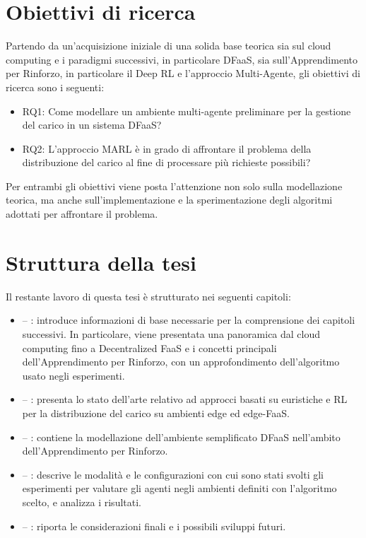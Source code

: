 \section{Obiettivi di ricerca}
\label{sec:1_obiettivi_ricerca}

Partendo da un'acquisizione iniziale di una solida base teorica sia sul cloud computing e i paradigmi successivi, in particolare DFaaS, sia sull'Apprendimento per Rinforzo, in particolare il Deep RL e l'approccio Multi-Agente, gli obiettivi di ricerca sono i seguenti:

\begin{itemize}
    \item RQ1: Come modellare un ambiente multi-agente preliminare per la gestione del carico in un sistema DFaaS?

    \item RQ2: L'approccio MARL è in grado di affrontare il problema della distribuzione del carico al fine di processare più richieste possibili?
\end{itemize}

Per entrambi gli obiettivi viene posta l'attenzione non solo sulla modellazione teorica, ma anche sull'implementazione e la sperimentazione degli algoritmi adottati per affrontare il problema.

\section{Struttura della tesi}

Il restante lavoro di questa tesi è strutturato nei seguenti capitoli:

\begin{itemize}
    \item {} -- : introduce informazioni di base necessarie per la comprensione dei capitoli successivi. In particolare, viene presentata una panoramica dal cloud computing fino a Decentralized FaaS e i concetti principali dell'Apprendimento per Rinforzo, con un approfondimento dell'algoritmo usato negli esperimenti.

    \item {} -- : presenta lo stato dell'arte relativo ad approcci basati su euristiche e RL per la distribuzione del carico su ambienti edge ed edge-FaaS.

    \item {} -- : contiene la modellazione dell'ambiente semplificato DFaaS nell'ambito dell'Apprendimento per Rinforzo.

    \item {} -- : descrive le modalità e le configurazioni con cui sono stati svolti gli esperimenti per valutare gli agenti negli ambienti definiti con l'algoritmo scelto, e analizza i risultati.

    \item {} -- : riporta le considerazioni finali e i possibili sviluppi futuri.
\end{itemize}